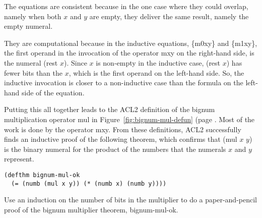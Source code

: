The equations are consistent because in the one case
where they could overlap, namely when both $x$ and $y$
are empty, they deliver the same result, namely the empty numeral.

They are computational because in the inductive equations,
\{m0xy\} and \{m1xy\}, the first operand in
the invocation of the operator mxy on the right-hand side,
is the numeral (rest $x$). Since $x$ is non-empty in the inductive case,
(rest $x$) has fewer bits than the $x$, which is the first operand
on the left-hand side.
So, the inductive invocation is closer to a non-inductive
case than the formula on the left-hand side of the equation.

Putting this all together leads to the ACL2 definition
of the bignum multiplication operator mul in
Figure~\ref{fig:bignum-mul-defun} (page \pageref{fig:bignum-mul-defun}.
Most of the work is done by the operator mxy.
From these definitions, ACL2 successfully finds an
inductive proof of the following theorem,
which confirms that (mul $x$ $y$) is the binary numeral
for the product of the numbers that the numerals $x$ and $y$ represent.

\label{bignum-mul-thm}
\begin{Verbatim}
(defthm bignum-mul-ok
  (= (numb (mul x y)) (* (numb x) (numb y))))
\end{Verbatim}

\begin{ExerciseList}
\Exercise
Use an induction on the number of bits in the
multiplier to do a paper-and-pencil proof of
the bignum multiplier theorem, bignum-mul-ok.
\end{ExerciseList}


